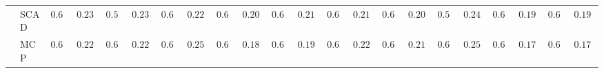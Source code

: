 \begin{tabular}{p{0.2cm}p{1cm}|p{0.6cm}p{0.6cm}|p{0.6cm}p{0.6cm}p{0.6cm}p{0.6cm}p{0.6cm}p{0.6cm}|p{0.6cm}p{0.6cm}p{0.6cm}p{0.6cm}p{0.6cm}p{0.6cm}|p{0.6cm}p{0.6cm}p{0.6cm}p{0.6cm}p{0.6cm}p{0.6cm}}
 & SCAD  & $0.612$ & $0.2306$ & $0.580$ & $0.2370$ & $0.624$ & $0.2243$ & $0.652$ & $0.2082$ & $0.624$ & $0.2114$ & $0.632$ & $0.2197$ & $0.668$ & $0.2014$ & $0.576$ & $0.2483$ & $0.646$ & $0.1904$ & $0.662$ & $0.1984$ \\
 & MCP  & $0.674$ & $0.2232$ & $0.644$ & $0.2267$ & $0.648$ & $0.2544$ & $0.672$ & $0.1875$ & $0.678$ & $0.1926$ & $0.686$ & $0.2261$ & $0.668$ & $0.2150$ & $0.630$ & $0.2580$ & $0.688$ & $0.1783$ & $0.688$ & $0.1783$ \\
\hline 
\end{tabular}


